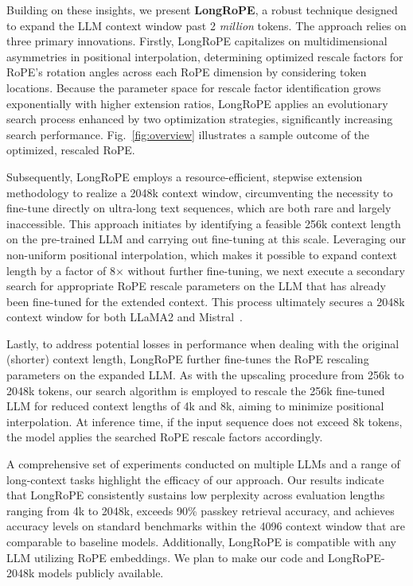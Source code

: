 Building on these insights, we present \textbf{LongRoPE}, a robust technique designed to expand the LLM context window past 2 \emph{million} tokens. The approach relies on three primary innovations. Firstly, {LongRoPE} capitalizes on multidimensional asymmetries in positional interpolation, determining optimized rescale factors for RoPE's rotation angles across each RoPE dimension by considering token locations. Because the parameter space for rescale factor identification grows exponentially with higher extension ratios, {LongRoPE} applies an evolutionary search process enhanced by two optimization strategies, significantly increasing search performance. Fig.~\ref{fig:overview} illustrates a sample outcome of the optimized, rescaled RoPE.

Subsequently, {LongRoPE} employs a resource-efficient, stepwise extension methodology to realize a 2048k context window, circumventing the necessity to fine-tune directly on ultra-long text sequences, which are both rare and largely inaccessible. This approach initiates by identifying a feasible 256k context length on the pre-trained LLM and carrying out fine-tuning at this scale. Leveraging our non-uniform positional interpolation, which makes it possible to expand context length by a factor of 8$\times$ without further fine-tuning, we next execute a secondary search for appropriate RoPE rescale parameters on the LLM that has already been fine-tuned for the extended context. This process ultimately secures a 2048k context window for both LLaMA2 and Mistral~\cite{mistral}.

Lastly, to address potential losses in performance when dealing with the original (shorter) context length, {LongRoPE} further fine-tunes the RoPE rescaling parameters on the expanded LLM. As with the upscaling procedure from 256k to 2048k tokens, our search algorithm is employed to rescale the 256k fine-tuned LLM for reduced context lengths of 4k and 8k, aiming to minimize positional interpolation. At inference time, if the input sequence does not exceed 8k tokens, the model applies the searched RoPE rescale factors accordingly.

A comprehensive set of experiments conducted on multiple LLMs and a range of long-context tasks highlight the efficacy of our approach. Our results indicate that LongRoPE consistently sustains low perplexity across evaluation lengths ranging from 4k to 2048k, exceeds 90\% passkey retrieval accuracy, and achieves accuracy levels on standard benchmarks within the 4096 context window that are comparable to baseline models. Additionally, LongRoPE is compatible with any LLM utilizing RoPE embeddings. We plan to make our code and LongRoPE-2048k models publicly available.


